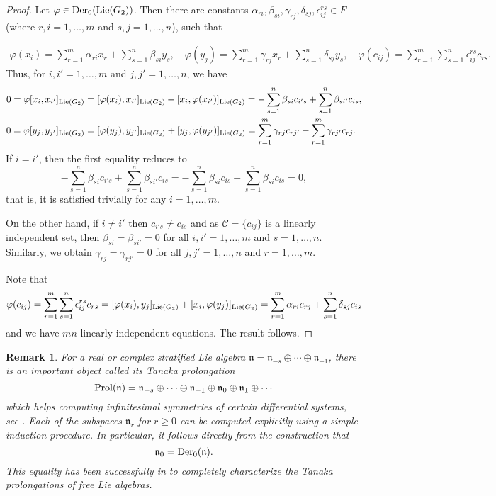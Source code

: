 \documentclass[12pt]{amsart}
\newtheorem{remark}[teo]{Remark}
\begin{document}
\begin{proof}
Let $\varphi\in{\rm Der}_0({\rm Lie}(G_2))$. Then there are constants $\alpha_{ri},\beta_{si},\gamma_{rj},\delta_{sj},\epsilon_{ij}^{rs}\in F$ (where $r,i=1,\dotsc,m$ and $s,j=1,\dotsc,n$), such that 

\begin{align*}
\varphi(x_i)=\sum_{r=1}^m \alpha_{ri}x_r+\sum_{s=1}^n \beta_{si}y_s,\quad 
\varphi(y_j)=\sum_{r=1}^m \gamma_{rj}x_r+\sum_{s=1}^n \delta_{sj}y_s,\quad 
\varphi(c_{ij})=\sum_{r=1}^m \sum_{s=1}^n \epsilon_{ij}^{rs} c_{rs}.
\end{align*}
Thus, for $i,i'=1,\dotsc,m$ and $j,j'=1,\dotsc,n$, we have
\begin{align*}
0=\varphi[x_i,x_{i'}]_{{\rm Lie}(G_2)}&=[\varphi(x_i),x_{i'}]_{{\rm Lie}(G_2)}+[x_i,\varphi(x_{i'})]_{{\rm Lie}(G_2)}=-\sum_{s=1}^n \beta_{si}c_{i's}+\sum_{s=1}^n \beta_{si'}c_{is},\\
0=\varphi[y_j,y_{j'}]_{{\rm Lie}(G_2)}&=[\varphi(y_j),y_{j'}]_{{\rm Lie}(G_2)}+[y_j,\varphi(y_{j'})]_{{\rm Lie}(G_2)}=\sum_{r=1}^m\gamma_{rj}c_{rj'}-\sum_{r=1}^m\gamma_{rj'}c_{rj}.
\end{align*}
If $i=i'$, then the first equality reduces to
\[
-\sum_{s=1}^n \beta_{si}c_{i's}+\sum_{s=1}^n \beta_{si'}c_{is}=-\sum_{s=1}^n \beta_{si}c_{is}+\sum_{s=1}^n \beta_{si}c_{is}=0,
\]
that is, it is satisfied trivially for any $i=1,\hdots,m$. 

On the other hand, if $i\neq i'$ then $c_{i's}\neq c_{is}$ and as ${\mathcal C}=\{c_{ij}\}$ is a linearly independent set, then $\beta_{si}=\beta_{si'}=0$ for all $i,i'=1,\hdots, m$ and $s=1,\hdots, n.$ Similarly, we obtain $\gamma_{rj}=\gamma_{rj'}=0$ for all $j,j'=1,\hdots, n$ and $r=1,\hdots, m.$

Note that 
\[\varphi(c_{ij})=\sum_{r=1}^m \sum_{s=1}^n \epsilon_{ij}^{rs}c_{rs}=[\varphi(x_i),y_j]_{{\rm Lie}(G_2)}+[x_i,\varphi(y_j)]_{{\rm Lie}(G_2)}=\sum_{r=1}^m\alpha_{ri}c_{rj}+\sum_{s=1}^n \delta_{sj}c_{is}\]
and we have $mn$ linearly independent equations. The result follows.
\end{proof}

\begin{remark}
For a real or complex stratified Lie algebra $\mathfrak{n}=\mathfrak{n}_{-s}\oplus \cdots \oplus \mathfrak{n}_{-1}$, there is an important object called its \emph{Tanaka prolongation}
\[
{\rm Prol}(\mathfrak{n})=\mathfrak{n}_{-s}\oplus \cdots \oplus \mathfrak{n}_{-1}\oplus\mathfrak{n}_{0}\oplus\mathfrak{n}_{1}\oplus\cdots
\]
which helps computing infinitesimal symmetries of certain differential systems, see \cite{tanaka}. Each of the subspaces $\mathfrak{n}_r$ for $r\geq0$ can be computed explicitly using a simple induction procedure. In particular, it follows directly from the construction that
\[
\mathfrak{n}_0={\rm Der}_0(\mathfrak{n}).
\]
This equality has been successfully in \cite{ben} to completely characterize the Tanaka prolongations of free Lie algebras.
\end{remark}
\end{document}
